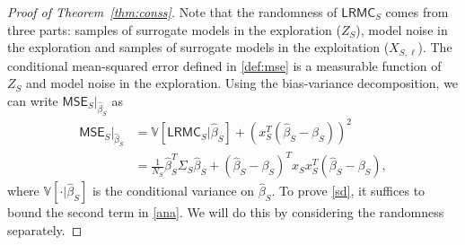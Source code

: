 \documentclass[a4paper,11pt]{article}
\numberwithin{equation}{section}
\theoremstyle{plain}
\theoremstyle{definition}
\def\V{{\mathbb V}}
\def\mse{{\textsf{MSE}}}
\def\lrmc{{\textsf{LRMC}}}
\begin{document}
\begin{proof}[Proof of Theorem~\ref{thm:conss}]
Note that the randomness of $\lrmc_S$ comes from three parts: samples of surrogate models in the exploration ($Z_S$), model noise in the exploration and samples of surrogate models in the exploitation ($X_{S,\ell}$). The conditional mean-squared error defined in \eqref{def:mse} is a measurable function of $Z_S$ and model noise in the exploration. 
Using the bias-variance decomposition, we can write $\mse_S|_{\widehat{\beta}_S}$ as 
\begin{align}
\mse_S|_{\widehat{\beta}_S} &= \V\left[\lrmc_S\big |\widehat{\beta}_S\right] + (x_S^T(\widehat{\beta}_S-\beta_S))^2\nonumber\\
& = \frac{1}{N_S}\widehat{\beta}_S^T\Sigma_S\widehat{\beta}_S + (\widehat{\beta}_S-\beta_S)^Tx_Sx_S^T(\widehat{\beta}_S-\beta_S),\label{ana}
\end{align}
where $\V[ \cdot  | \widehat{\beta}_S ]$ is the conditional variance on $\widehat{\beta}_S$.   
To prove \eqref{sd}, it suffices to bound the second term in \eqref{ana}.
We will do this by considering the randomness separately. 


\end{proof}
\end{document}
